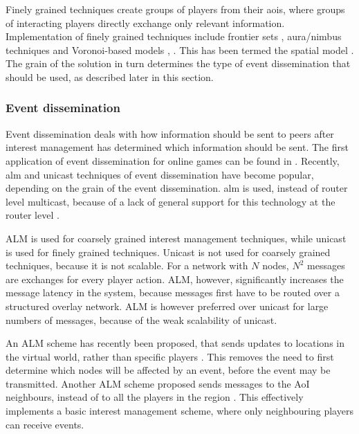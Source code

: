 \documentclass[10pt,a4paper,journal,cspaper,compsoc]{IEEEtran}
\begin{document}
Finely grained techniques create groups of players from their \acp{aoi}, where groups of interacting players directly exchange only relevant
information. Implementation of finely grained techniques include frontier sets \cite{IM_frontier_sets}, aura/nimbus techniques
\cite{Benford_spatial_IM} and Voronoi-based models \cite{Hu_voronoi_IM}, \cite{Buyukkaya_voronoi_state_management}. This has been termed the spatial
model \cite{Fan_deisgn_issues_p2p}. The grain of the solution in turn determines the type of event dissemination that should be used, as described
later in this section.

\subsubsection{Event dissemination}

Event dissemination deals with how information should be sent to peers after interest management has determined which information should be sent. The
first application of event dissemination for online games can be found in \cite{first_GED}. Recently, \ac{alm} and unicast techniques of event
dissemination have become popular, depending on the grain of the event dissemination. \ac{alm} is used, instead of router level multicast, because of
a lack of general support for this technology at the router level \cite{ip_multicast_deployment_issues}.

ALM is used for coarsely grained interest management techniques, while unicast is used for finely grained techniques. Unicast is not used for
coarsely grained techniques, because it is not scalable. For a network with $N$ nodes, $N^2$ messages are exchanges for every player action. ALM,
however, significantly increases the message latency in the system, because messages first have to be routed over a structured overlay network. ALM
is however preferred over unicast for large numbers of messages, because of the weak scalability of unicast.

An ALM scheme has recently been proposed, that sends updates to locations in the virtual world, rather than specific players
\cite{Ghaffari_Delaunay_churn_mobility}. This removes the need to first determine which nodes will be affected by an event, before the event may be
transmitted. Another ALM scheme proposed sends messages to the AoI neighbours, instead of to all the players in the region
\cite{Seeger_area_based_gossip_multicast}. This effectively implements a basic interest management scheme, where only neighbouring players can
receive events.
\end{document}
